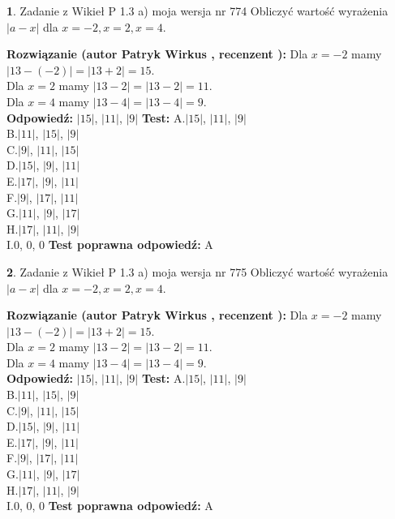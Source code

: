 \documentclass[12pt, a4paper]{article}
\theoremstyle{definition} %
\newtheorem{zad}{}
\newcommand{\zadStart}[1]{\begin{zad}#1\newline}
\newcommand{\zadStop}{\end{zad}}
\newcommand{\rozwStart}[2]{\noindent \textbf{Rozwiązanie (autor #1 , recenzent #2): }\newline}
\newcommand{\rozwStop}{\newline}
\newcommand{\odpStart}{\noindent \textbf{Odpowiedź:}\newline}
\newcommand{\odpStop}{\newline}
\newcommand{\testStart}{\noindent \textbf{Test:}\newline}
\newcommand{\testStop}{\newline}
\newcommand{\kluczStart}{\noindent \textbf{Test poprawna odpowiedź:}\newline}
\newcommand{\kluczStop}{\newline}
\begin{document}
\zadStart{Zadanie z Wikieł P 1.3 a) moja wersja nr 774}
Obliczyć wartość wyrażenia $|a - x|$ dla $x=-2,x=2,x=4$.
\zadStop
\rozwStart{Patryk Wirkus}{}
Dla $x = -2$ mamy $|13 - (-2)| = |13 + 2| = 15$.\\
Dla $x = 2$ mamy $|13 - 2| = |13 - 2| = 11$.\\
Dla $x = 4$ mamy $|13 - 4| = |13 - 4| = 9$.\\
\rozwStop
\odpStart
$|15|$, $|11|$, $|9|$
\odpStop
\testStart
A.$|15|$, $|11|$, $|9|$\\
B.$|11|$, $|15|$, $|9|$\\
C.$|9|$, $|11|$, $|15|$\\
D.$|15|$, $|9|$, $|11|$\\
E.$|17|$, $|9|$, $|11|$\\
F.$|9|$, $|17|$, $|11|$\\
G.$|11|$, $|9|$, $|17|$\\
H.$|17|$, $|11|$, $|9|$\\
I.$0$, $0$, $0$
\testStop
\kluczStart
A
\kluczStop



\zadStart{Zadanie z Wikieł P 1.3 a) moja wersja nr 775}
Obliczyć wartość wyrażenia $|a - x|$ dla $x=-2,x=2,x=4$.
\zadStop
\rozwStart{Patryk Wirkus}{}
Dla $x = -2$ mamy $|13 - (-2)| = |13 + 2| = 15$.\\
Dla $x = 2$ mamy $|13 - 2| = |13 - 2| = 11$.\\
Dla $x = 4$ mamy $|13 - 4| = |13 - 4| = 9$.\\
\rozwStop
\odpStart
$|15|$, $|11|$, $|9|$
\odpStop
\testStart
A.$|15|$, $|11|$, $|9|$\\
B.$|11|$, $|15|$, $|9|$\\
C.$|9|$, $|11|$, $|15|$\\
D.$|15|$, $|9|$, $|11|$\\
E.$|17|$, $|9|$, $|11|$\\
F.$|9|$, $|17|$, $|11|$\\
G.$|11|$, $|9|$, $|17|$\\
H.$|17|$, $|11|$, $|9|$\\
I.$0$, $0$, $0$
\testStop
\kluczStart
A
\kluczStop
\end{document}
